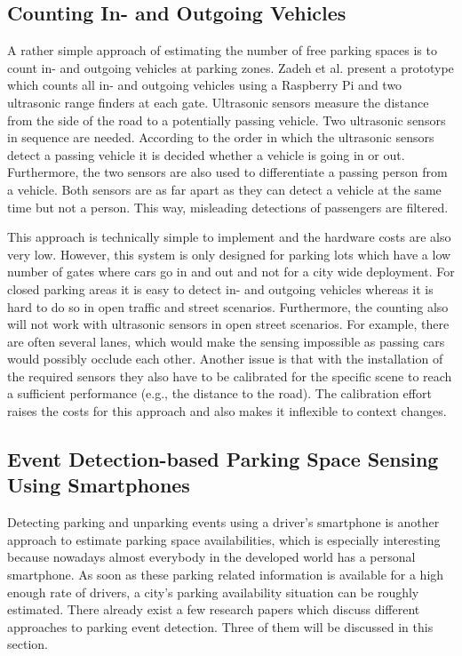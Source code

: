 \subsection{Counting In- and Outgoing Vehicles}
\label{sec:counting_in_out_park_sensing}

A rather simple approach of estimating the number of free parking spaces is to count in- and outgoing vehicles at parking zones. Zadeh et al. \cite{smarturbanparkingdetection} present a prototype which counts all in- and outgoing vehicles using a Raspberry Pi and two ultrasonic range finders at each gate. Ultrasonic sensors measure the distance from the side of the road to a potentially passing vehicle. Two ultrasonic sensors in sequence are needed. According to the order in which the ultrasonic sensors detect a passing vehicle it is decided whether a vehicle is going in or out. Furthermore,
the two sensors are also used to differentiate a passing person from a vehicle. Both sensors are as far apart as they can detect a vehicle at the same time but not a person. This way, misleading detections of passengers are filtered.

This approach is technically simple to implement and the hardware costs are also very low. However, this system is only designed for parking lots which have a low number of gates where cars go in and out and not for a city wide deployment. For closed parking areas it is easy to detect in- and outgoing vehicles whereas it is hard to do so in open traffic and street scenarios. Furthermore, the counting also will not work with ultrasonic sensors in open street scenarios. For example, there are often several lanes, which would make the sensing impossible as passing cars would possibly occlude each other. Another issue is that with the installation of the required sensors they also have to be calibrated for the specific scene to reach a sufficient performance (e.g., the distance to the road). The calibration effort raises the costs for this approach and also makes it inflexible to context changes.







\subsection{Event Detection-based Parking Space Sensing Using Smartphones}
\label{sec:event_detection_park_sensing}

Detecting parking and unparking events using a driver's smartphone is another approach to estimate parking space availabilities, which is especially interesting because nowadays almost everybody in the developed world has a personal smartphone. As soon as these parking related information is available for a high enough rate of drivers, a city's parking availability situation can be roughly estimated. There already exist a few research papers which discuss different approaches to parking event detection. Three of them will be discussed in this
section.

